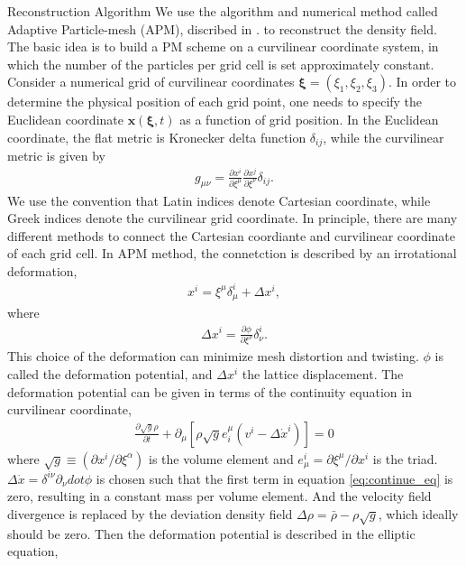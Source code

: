 \begin{section}{Reconstruction Algorithm}
  \label{sec:reconstruction}
    We use the algorithm and numerical method called Adaptive Particle-mesh (APM), discribed in \cite{bib:Pen1995,bib:Pen1998}. to reconstruct the density field. The basic idea is to build a PM scheme on a curvilinear coordinate system, in which the number of the particles per grid cell is set approximately constant. 
    Consider a numerical grid of curvilinear coordinates $\bm{\xi}=\left(\xi_1,\xi_2,\xi_3\right)$. In order to determine the physical position of each grid point, one needs to specify the Euclidean coordinate $\bm{x}(\bm{\xi},t)$ as a function of grid position. In the Euclidean coordinate, the flat metric is Kronecker delta function $\delta_{ij}$, while the curvilinear metric is given by
\begin{align}
    g_{\mu\nu}=\frac{\partial x^i}{\partial \xi ^\mu} \frac{\partial x^j}{\partial \xi ^\nu}\delta_{ij}.
\end{align}
    We use the convention that Latin indices denote Cartesian coordinate, while Greek indices denote the curvilinear grid coordinate.
    In principle, there are many different methods to connect the Cartesian coordiante and curvilinear coordinate of each grid cell. In APM method, the connetction is described by an irrotational deformation,
\begin{align}
    x^i=\xi ^\mu \delta ^i _\mu + \Delta x^i,
\end{align}
where
\begin{align}
 \label{eq:disp}
    \Delta x^i=\frac{\partial \phi}{\partial \xi ^ \nu}\delta ^i _\nu .
\end{align}
    This choice of the deformation can minimize mesh distortion and twisting. $\phi$ is called the deformation potential, and $\Delta x^i$ the lattice displacement. The deformation potential can be given in terms of the continuity equation in curvilinear coordinate,
\begin{align}
 \label{eq:continue_eq}
    \frac{\partial \sqrt{g} \rho }{\partial t}+\partial_\mu \left[\rho \sqrt{g} e^\mu _i \left(v^i - \Delta \dot{x}^i \right) \right] =0
\end{align}
where $\sqrt{g} \equiv (\partial x^i / \partial \xi ^ \alpha)$ is the volume element and $e^i _\mu = \partial \xi ^\mu / \partial x^i$ is the triad. $\Delta \dot{x}=\delta ^{i\nu}\partial _\nu dot{\phi}$ is chosen such that the first term in equation \ref{eq:continue_eq} is zero, resulting in a constant mass per volume element. And the velocity field divergence is replaced by the deviation density field $\Delta \rho = \bar{\rho}-\rho \sqrt{g}$, which ideally should be zero. Then the deformation potential is described in the elliptic equation,

\end{section}
